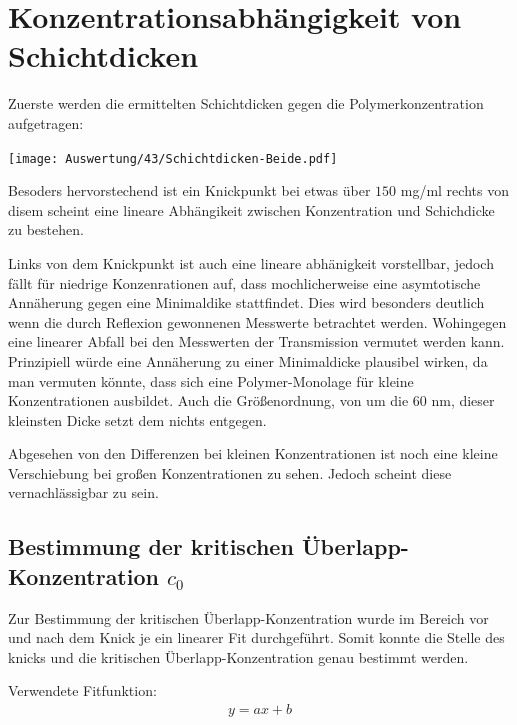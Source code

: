 
\newpage
\section{Konzentrationsabhängigkeit von Schichtdicken}
\label{sec:konzDicke}
Zuerste werden die ermittelten Schichtdicken gegen die Polymerkonzentration aufgetragen:

\begin{center}
	\captionsetup{type=figure}
	\texttt{[image: Auswertung/43/Schichtdicken-Beide.pdf]}
	\label{fig:fitgueteReflexion}
\end{center}

Besoders hervorstechend ist ein Knickpunkt bei etwas über $150$ mg/ml rechts von disem scheint eine lineare Abhängikeit zwischen Konzentration und Schichdicke zu bestehen.

Links von dem Knickpunkt ist auch eine lineare abhänigkeit vorstellbar, jedoch fällt für niedrige Konzenrationen auf, dass mochlicherweise eine asymtotische Annäherung gegen eine Minimaldike stattfindet. Dies wird besonders deutlich wenn die durch Reflexion gewonnenen Messwerte betrachtet werden. Wohingegen eine linearer Abfall bei den Messwerten der Transmission vermutet werden kann. Prinzipiell würde eine Annäherung zu einer Minimaldicke plausibel wirken, da man vermuten könnte, dass sich eine Polymer-Monolage für kleine Konzentrationen ausbildet. Auch die Größenordnung, von um die $60$ nm, dieser kleinsten Dicke setzt dem nichts entgegen.

Abgesehen von den Differenzen bei kleinen Konzentrationen ist noch eine kleine Verschiebung bei großen Konzentrationen zu sehen. Jedoch scheint diese vernachlässigbar zu sein.


\newpage
\subsection{Bestimmung der kritischen Überlapp-Konzentration $c_0$}

Zur Bestimmung der kritischen Überlapp-Konzentration wurde im Bereich vor und nach dem Knick je ein linearer Fit durchgeführt. Somit konnte die Stelle des knicks und die kritischen Überlapp-Konzentration genau bestimmt werden.

Verwendete Fitfunktion:
\begin{gather}
	y = ax + b
\end{gather}

